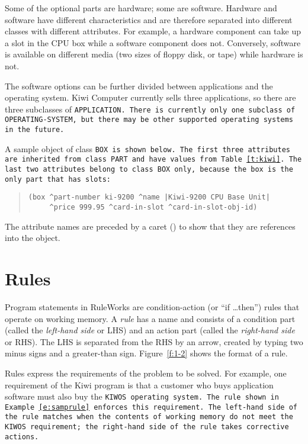 Some of the optional parts are hardware; some are software. Hardware
and software have different characteristics and are therefore
separated into different classes with different attributes. For
example, a hardware component can take up a slot in the CPU box while
a software component does not.  Conversely, software is available on
different media (two sizes of floppy disk, or tape) while hardware is
not.

The software options can be further divided between applications and
the operating system. Kiwi Computer currently sells three
applications, so there are three subclasses of \tt{APPLICATION}. There
is currently only one subclass of \tt{OPERATING-SYSTEM}, but there may
be other supported operating systems in the future.

A sample object of class \tt{BOX} is shown below.  The first three
attributes are inherited from class \tt{PART} and have values from
Table~\ref{t:kiwi}. The last two attributes belong to class \tt{BOX}
only, because the box is the only part that has slots:

\begin{quote}
\begin{verbatim}
(box ^part-number ki-9200 ^name |Kiwi-9200 CPU Base Unit| 
     ^price 999.95 ^card-in-slot ^card-in-slot-obj-id)
\end{verbatim}
\end{quote}

The attribute names are preceded by a caret (\ct) to show that they
are references into the object.

\section{Rules}

Program statements in RuleWorks are condition-action (or ``if
\ldots{}then'') rules that operate on working memory. A \emph{rule}
has a name and consists of a condition part (called the
\emph{left-hand side} or LHS) and an action part (called the
\emph{right-hand side} or RHS). The LHS is separated from the RHS by
an arrow, created by typing two minus signs and a greater-than
sign. Figure~\ref{f:1-2} shows the format of a rule.

Rules express the requirements of the problem to be solved. For
example, one requirement of the Kiwi program is that a customer who
buys application software must also buy the \tt{KIWOS} operating
system. The rule shown in Example~\ref{e:samprule} enforces this
requirement. The left-hand side of the rule matches when the contents
of working memory do not meet the \tt{KIWOS} requirement; the
right-hand side of the rule takes corrective actions.

